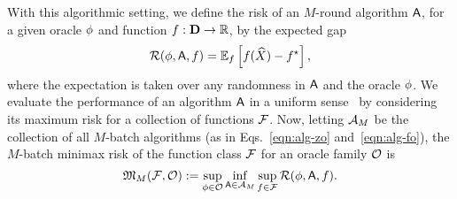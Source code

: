 
\newcommand{\minimax}{\mathfrak{M}}

With this algorithmic setting, we define the risk of an $M$-round
algorithm $\mathsf{A}$, for a given oracle $\phi$ and function $f : \mathbf{D}
\to \mathbb{R}$, by the expected gap
\begin{equation*}
  \mathcal{R}(\phi, \mathsf{A}, f) = \mathbb{E}_f \left[f(\widehat{X}) - f^\star\right],
\end{equation*}
where the expectation is taken over any randomness in $\mathsf{A}$ and the oracle
$\phi$. We evaluate the performance of an algorithm $\mathsf{A}$ in a uniform
sense~\citep{Wald39} by considering its maximum risk for a collection of
functions $\mathcal{F}$. Now, letting $\mathcal{A}_M$ be the collection of all
$M$-batch algorithms (as in Eqs.~\eqref{eqn:alg-zo} and~\eqref{eqn:alg-fo}),
the $M$-batch minimax risk of the function class $\mathcal{F}$ for an oracle family $\mathcal{O}$ is
\begin{equation}
  \label{eqn:minimax-risk-definition}
  \minimax_M(\ffamily, \ofamily) \defeq 
  \sup_{\orc \in \ofamily}
  \inf_{\alg \in \sfamily_M}
  \sup_{f\in \ffamily} \risk (\orc, \alg, f).
\end{equation}

